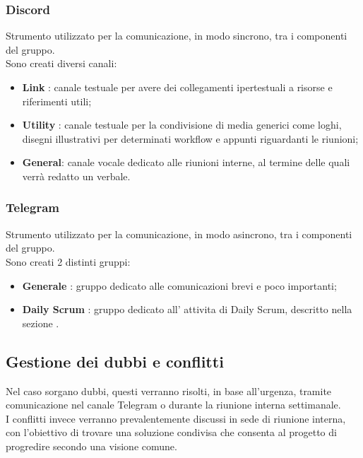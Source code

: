        \subsubsection{Discord}
        Strumento utilizzato per la comunicazione, in modo sincrono, tra i componenti del gruppo.\\
        Sono creati diversi canali:
        \begin{itemize}
            \item \textbf{Link} : canale testuale per avere dei collegamenti ipertestuali a risorse e riferimenti utili;
            \item \textbf{Utility} : canale testuale per la condivisione di media generici come loghi, disegni illustrativi per determinati workflow e appunti riguardanti le riunioni;
            \item \textbf{General}: canale vocale dedicato alle riunioni interne, al termine delle quali verrà redatto un verbale.
        \end{itemize}

        \subsubsection{Telegram}
        Strumento utilizzato per la comunicazione, in modo asincrono, tra i componenti del gruppo.\\
        Sono creati 2 distinti gruppi:
        \begin{itemize}
            \item \textbf{Generale} : gruppo dedicato alle comunicazioni brevi e poco importanti;
            \item \textbf{Daily Scrum} : gruppo dedicato all' attivita di Daily Scrum, descritto nella sezione .
        \end{itemize}


    \subsection{Gestione dei dubbi e conflitti}
        Nel caso sorgano dubbi, questi verranno risolti, in base all'urgenza, 
        tramite comunicazione nel canale Telegram o durante la riunione interna 
        settimanale. \\
        I conflitti invece verranno prevalentemente discussi in sede di riunione 
        interna, con l'obiettivo di trovare una soluzione condivisa che consenta 
        al progetto di progredire secondo una visione comune.


